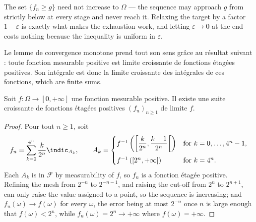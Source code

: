 \begin{remark}
  The set $\{f_{n} \geq g\}$ need not increase to $\Omega$ --- the sequence may
  approach $g$ from strictly below at every stage and never reach it. Relaxing the
  target by a factor $1-\varepsilon$ is exactly what makes the exhaustion work, and
  letting $\varepsilon \to 0$ at the end costs nothing because the inequality is
  uniform in $\varepsilon$.
\end{remark}

Le lemme de convergence monotone prend tout son sens grâce au résultat suivant :
toute fonction mesurable positive est limite croissante de fonctions étagées
positives. Son intégrale est donc la limite croissante des intégrales de ces
fonctions, which are finite sums.

\begin{lemma}
  Soit $f : \Omega \to [0,+\infty]$ une fonction mesurable positive. Il existe une
  suite croissante de fonctions étagées positives $(f_{n})_{n \geq 1}$ de limite
  $f$.
\end{lemma}

\begin{proof}
  Pour tout $n \geq 1$, soit
  \[
    f_{n} = \sum_{k=0}^{4^{n}} \frac{k}{2^{n}} \indic_{A_{k}},
    \qquad
    A_{k} =
    \begin{cases}
      f^{-1}\left( \left[ \dfrac{k}{2^{n}}, \dfrac{k+1}{2^{n}} \right[ \right)
        & \text{for } k = 0,\ldots,4^{n}-1,\\[10pt]
      f^{-1}\left( [2^{n},+\infty] \right) & \text{for } k = 4^{n}.
    \end{cases}
  \]
  Each $A_{k}$ is in $\mathcal{F}$ by measurability of $f$, so $f_{n}$ is a fonction
  étagée positive. Refining the mesh from $2^{-n}$ to $2^{-n-1}$, and raising the cut-off from
  $2^{n}$ to $2^{n+1}$, can only raise the value assigned to a point, so the sequence
  is increasing; and $f_{n}(\omega) \to f(\omega)$ for every $\omega$, the error being
  at most $2^{-n}$ once $n$ is large enough that $f(\omega) < 2^{n}$, while
  $f_{n}(\omega) = 2^{n} \to +\infty$ where $f(\omega) = +\infty$.
\end{proof}

